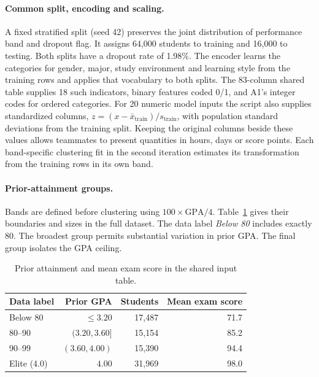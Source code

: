 \paragraph{Common split, encoding and scaling.}
A fixed stratified split (seed 42) preserves the joint distribution of
performance band and dropout flag. It assigns 64,000 students to training
and 16,000 to testing. Both splits have a dropout rate of 1.98\%.
The encoder learns the categories for gender, major, study environment and
learning style from the training rows and applies that vocabulary to both
splits. The 83-column shared table supplies 18 such indicators, binary features
coded 0/1, and A1's integer codes for ordered categories.
For 20 numeric model inputs the script also supplies standardized columns,
$z=(x-\bar{x}_{\mathrm{train}})/s_{\mathrm{train}}$, with population
standard deviations from the training split. Keeping the original columns
beside these values allows teammates to present quantities in hours, days
or score points. Each band-specific clustering fit in the second iteration
estimates its transformation from the training rows in its own band.

\paragraph{Prior-attainment groups.}
Bands are defined before clustering using $100\times\mathrm{GPA}/4$.
Table~\ref{tab:shared-bands} gives their boundaries and sizes in the full
dataset. The data label \emph{Below 80} includes exactly 80.
The broadest group permits substantial variation in prior GPA. The final
group isolates the GPA ceiling.

\begin{table}[htbp]\centering\small
\caption{Prior attainment and mean exam score in the shared input table.}
\label{tab:shared-bands}
\begin{tabular}{@{}lrrr@{}}
\toprule
Data label & Prior GPA & Students & Mean exam score \\
\midrule
Below 80 & $\leq 3.20$ & 17,487 & 71.7 \\
80--90 & $(3.20,3.60]$ & 15,154 & 85.2 \\
90--99 & $(3.60,4.00)$ & 15,390 & 94.4 \\
Elite (4.0) & $4.00$ & 31,969 & 98.0 \\
\bottomrule
\end{tabular}
\end{table}
